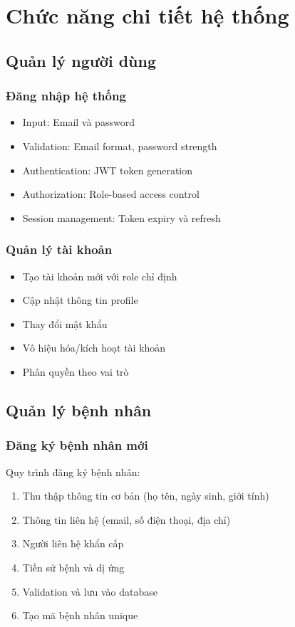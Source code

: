 \documentclass[12pt,a4paper]{report}
\begin{document}
    \chapter{Chức năng chi tiết hệ thống}

    \section{Quản lý người dùng}

    \subsection{Đăng nhập hệ thống}
    \begin{itemize}
        \item Input: Email và password
        \item Validation: Email format, password strength
        \item Authentication: JWT token generation
        \item Authorization: Role-based access control
        \item Session management: Token expiry và refresh
    \end{itemize}

    \subsection{Quản lý tài khoản}
    \begin{itemize}
        \item Tạo tài khoản mới với role chỉ định
        \item Cập nhật thông tin profile
        \item Thay đổi mật khẩu
        \item Vô hiệu hóa/kích hoạt tài khoản
        \item Phân quyền theo vai trò
    \end{itemize}

    \section{Quản lý bệnh nhân}

    \subsection{Đăng ký bệnh nhân mới}
    Quy trình đăng ký bệnh nhân:
    \begin{enumerate}
        \item Thu thập thông tin cơ bản (họ tên, ngày sinh, giới tính)
        \item Thông tin liên hệ (email, số điện thoại, địa chỉ)
        \item Người liên hệ khẩn cấp
        \item Tiền sử bệnh và dị ứng
        \item Validation và lưu vào database
        \item Tạo mã bệnh nhân unique
    \end{enumerate}
\end{document}
